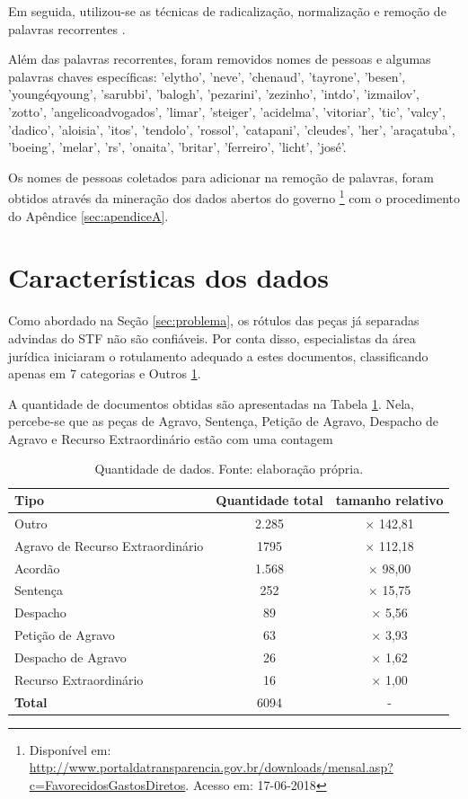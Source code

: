 Em seguida, utilizou-se as técnicas de radicalização, normalização \cite{SINGH2016} e remoção de palavras recorrentes \cite{MANNING2008}.

Além das palavras recorrentes, foram removidos nomes de pessoas e algumas palavras chaves específicas: 'elytho', 'neve', 'chenaud', 'tayrone', 'besen', 'youngéqyoung', 'sarubbi', 'balogh', 'pezarini', 'zezinho', 'intdo', 'izmailov', 'zotto', 'angelicoadvogados', 'limar', 'steiger', 'acidelma', 'vitoriar', 'tic', 'valcy', 'dadico', 'aloisia', 'itos', 'tendolo', 'rossol', 'catapani', 'cleudes', 'her', 'araçatuba', 'boeing', 'melar', 'rs', 'onaita', 'britar', 'ferreiro', 'licht', 'josé'.

Os nomes de pessoas coletados para adicionar na remoção de palavras, foram obtidos através da mineração dos dados abertos do governo \footnote{Disponível em: \url{http://www.portaldatransparencia.gov.br/downloads/mensal.asp?c=FavorecidosGastosDiretos}. Acesso em: 17-06-2018} com o procedimento do Apêndice \ref{sec:apendiceA}. 

\section{Características dos dados}

Como abordado na Seção \ref{sec:problema}, os rótulos das peças já separadas advindas do STF não são confiáveis. Por conta disso, especialistas da área jurídica iniciaram o rotulamento adequado a estes documentos, classificando apenas em 7 categorias e Outros \ref{tab:categoriasPecas}.

A quantidade de documentos obtidas são apresentadas na Tabela \ref{tab:categoriasPecas}. Nela, percebe-se que as peças de Agravo, Sentença, Petição de Agravo, Despacho de Agravo e Recurso Extraordinário estão com uma contagem 

\begin{table}[h]
	\centering    
	\caption{Quantidade de dados. Fonte: elaboração própria.}
    \label{tab:categoriasPecas}
	\begin{tabular}{|l|c|c|}
    \hline
    \textbf{Tipo} & \textbf{Quantidade total} & \textbf{tamanho relativo} \\ 
    \hline
    Outro &  2.285 & $\times$ 142,81  \\
    \hline
    Agravo de Recurso Extraordinário & 1795 & $\times$  112,18  \\
    \hline
    Acordão & 1.568 & $\times$ 98,00  \\
    \hline
    Sentença & 252 & $\times$ 15,75  \\
    \hline
    Despacho & 89 & $\times$ 5,56  \\
    \hline
    Petição de Agravo & 63 & $\times$ 3,93  \\
    \hline
    Despacho de Agravo & 26 & $\times$ 1,62  \\
    \hline
    Recurso Extraordinário & 16 & $\times$ 1,00  \\
    \hline
    \textbf{Total} & 6094 & - \\
    \hline

    \end{tabular}
\end{table}


